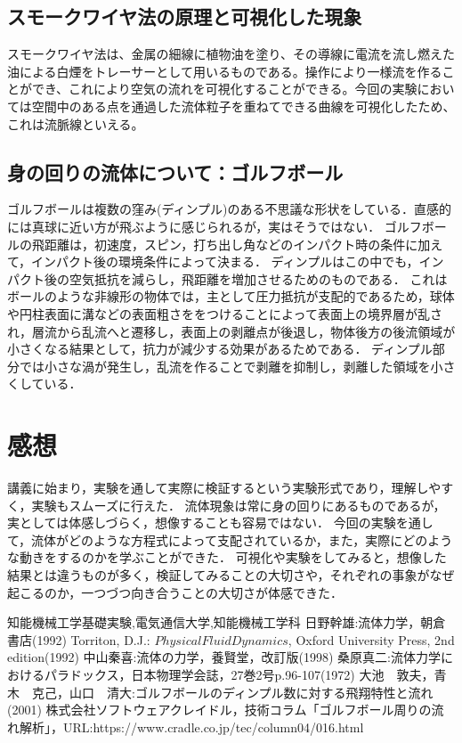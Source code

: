 \documentclass[a4paper,11pt,uplatex]{jsarticle}
\begin{document}
\subsection{スモークワイヤ法の原理と可視化した現象}
スモークワイヤ法は、金属の細線に植物油を塗り、その導線に電流を流し燃えた油による白煙をトレーサーとして用いるものである。操作により一様流を作ることができ、これにより空気の流れを可視化することができる。今回の実験においては空間中のある点を通過した流体粒子を重ねてできる曲線を可視化したため、これは流脈線といえる。
\subsection{身の回りの流体について：ゴルフボール\cite{s6}\cite{s7}}
ゴルフボールは複数の窪み(ディンプル)のある不思議な形状をしている．直感的には真球に近い方が飛ぶように感じられるが，実はそうではない．
ゴルフボールの飛距離は，初速度，スピン，打ち出し角などのインパクト時の条件に加えて，インパクト後の環境条件によって決まる．
ディンプルはこの中でも，インパクト後の空気抵抗を減らし，飛距離を増加させるためのものである．
これはボールのような非線形の物体では，主として圧力抵抗が支配的であるため，球体や円柱表面に溝などの表面粗さををつけることによって表面上の境界層が乱され，層流から乱流へと遷移し，表面上の剥離点が後退し，物体後方の後流領域が小さくなる結果として，抗力が減少する効果があるためである．
ディンプル部分では小さな渦が発生し，乱流を作ることで剥離を抑制し，剥離した領域を小さくしている．

\section{感想}
講義に始まり，実験を通して実際に検証するという実験形式であり，理解しやすく，実験もスムーズに行えた．
流体現象は常に身の回りにあるものであるが，実としては体感しづらく，想像することも容易ではない．
今回の実験を通して，流体がどのような方程式によって支配されているか，また，実際にどのような動きをするのかを学ぶことができた．
可視化や実験をしてみると，想像した結果とは違うものが多く，検証してみることの大切さや，それぞれの事象がなぜ起こるのか，一つづつ向き合うことの大切さが体感できた．

\begin{thebibliography}{9}
  知能機械工学基礎実験,電気通信大学,知能機械工学科
  日野幹雄:流体力学，朝倉書店(1992)
  Torriton, D.J.: $Physical Fluid Dynamics$, Oxford University Press, 2nd edition(1992)
  中山秦喜:流体の力学，養賢堂，改訂版(1998)
  桑原真二:流体力学におけるパラドックス，日本物理学会誌，27巻2号p.96-107(1972)
  大池　敦夫，青木　克己，山口　清大:ゴルフボールのディンプル数に対する飛翔特性と流れ(2001)
  株式会社ソフトウェアクレイドル，技術コラム「ゴルフボール周りの流れ解析」，URL:https://www.cradle.co.jp/tec/column04/016.html

\end{thebibliography}
\end{document}
